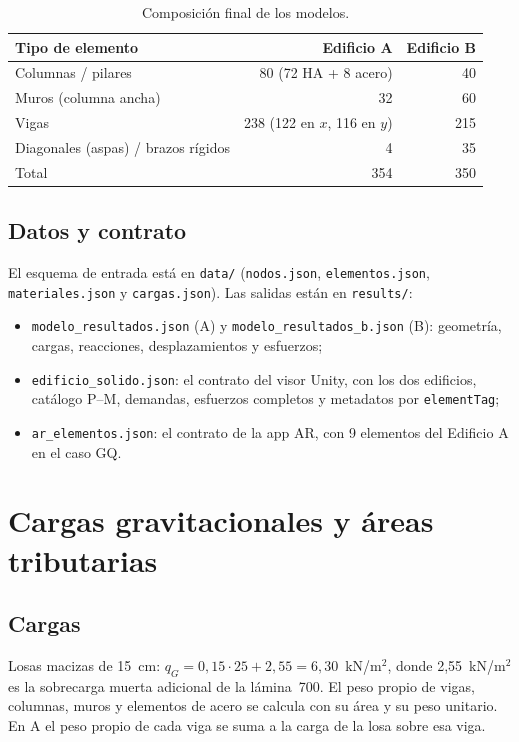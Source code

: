 \documentclass[11pt,a4paper]{article}
\begin{document}
\begin{table}[h]
\centering
\caption{Composición final de los modelos.}
\begin{tabular}{lrr}
\toprule
Tipo de elemento & Edificio A & Edificio B \\
\midrule
Columnas / pilares & 80 (72 HA + 8 acero) & 40 \\
Muros (columna ancha) & 32 & 60 \\
Vigas & 238 (122 en $x$, 116 en $y$) & 215 \\
Diagonales (aspas) / brazos rígidos & 4 & 35 \\
\midrule
Total & 354 & 350 \\
\bottomrule
\end{tabular}
\end{table}

\subsection{Datos y contrato}

El esquema de entrada está en \texttt{data/} (\texttt{nodos.json},
\texttt{elementos.json}, \texttt{materiales.json} y \texttt{cargas.json}). Las
salidas están en \texttt{results/}:
\begin{itemize}
  \item \texttt{modelo\_resultados.json} (A) y \texttt{modelo\_resultados\_b.json} (B):
        geometría, cargas, reacciones, desplazamientos y esfuerzos;
  \item \texttt{edificio\_solido.json}: el contrato del visor Unity, con los
        dos edificios, catálogo P--M, demandas, esfuerzos completos y metadatos
        por \texttt{elementTag};
  \item \texttt{ar\_elementos.json}: el contrato de la app AR, con 9 elementos
        del Edificio A en el caso GQ.
\end{itemize}

\section{Cargas gravitacionales y áreas tributarias}\label{sec:cargas}

\subsection{Cargas}

Losas macizas de 15~cm: $q_G = 0{,}15\cdot25 + 2{,}55 = 6{,}30$~kN/m$^2$,
donde 2,55~kN/m$^2$ es la sobrecarga muerta adicional de la lámina~700. El peso
propio de vigas, columnas, muros y elementos de acero se calcula con su área y
su peso unitario. En A el peso propio de cada viga se suma a la carga de la losa
sobre esa viga.
\end{document}
